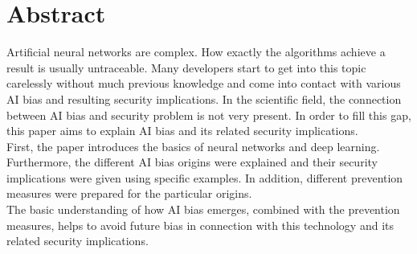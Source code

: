 \documentclass[12pt,oneside,a4paper,parskip]{scrbook}
\begin{document}
\section*{Abstract}
Artificial neural networks are complex. How exactly the algorithms achieve a result is usually untraceable. Many developers start to get into this topic carelessly without much previous knowledge and come into contact with various AI bias and resulting security implications. In the scientific field, the connection between AI bias and security problem is not very present. In order to fill this gap, this paper aims to explain AI bias and its related security implications.\\
First, the paper introduces the basics of neural networks and deep learning. Furthermore, the different AI bias origins were explained and their security implications were given using specific examples. In addition, different prevention measures were prepared for the particular origins.\\
The basic understanding of how AI bias emerges, combined with the prevention measures, helps to avoid future bias in connection with this technology and its related security implications.



\tableofcontents



\mainmatter
\end{document}
